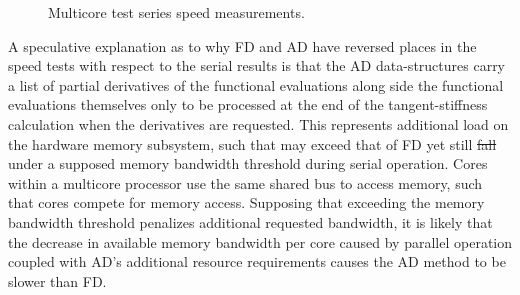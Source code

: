\documentclass[preprint,12pt]{elsarticle}
\providecommand{\DIFaddtex}[1]{{\protect\color{blue}\uwave{#1}}} %
\providecommand{\DIFdeltex}[1]{{\protect\color{red}\sout{#1}}}                      %
\providecommand{\DIFaddbegin}{} %
\providecommand{\DIFaddend}{} %
\providecommand{\DIFdelbegin}{} %
\providecommand{\DIFdelend}{} %
\providecommand{\DIFadd}[1]{\texorpdfstring{\DIFaddtex{#1}}{#1}} %
\providecommand{\DIFdel}[1]{\texorpdfstring{\DIFdeltex{#1}}{}} %
\begin{document}
%
\begin{figure}[tbp] 
    \centering 
    \scalebox{1.0}{}
    \caption{Multicore test series speed measurements.} 
    \label{fig:multi_speed}
\end{figure}
%
A speculative explanation as to why FD and AD have reversed places in the speed tests with respect to the serial results is that the AD data-structures carry a list of partial derivatives of the functional evaluations along side the functional evaluations themselves only to be processed at the end of the tangent-stiffness \DIFaddbegin \DIFadd{matrix }\DIFaddend calculation when the derivatives are requested. This represents additional load on the hardware memory subsystem, such that may exceed that of FD yet still \DIFdelbegin \DIFdel{fall }\DIFdelend \DIFaddbegin \DIFadd{falls }\DIFaddend under a supposed memory bandwidth threshold during serial operation. Cores within a multicore processor use the same shared bus to access memory, such that cores compete for memory access. Supposing that exceeding the memory bandwidth threshold penalizes additional requested bandwidth, it is likely that the decrease in available memory bandwidth per core caused by parallel operation coupled with AD's additional resource requirements causes the AD method to be slower than FD. 
\end{document}
